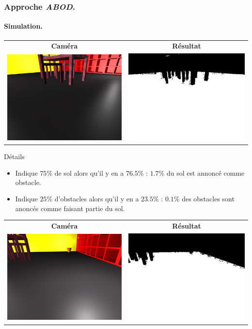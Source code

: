 \begin{frame}
    \frametitle{Approche \emph{ABOD}.}
    \framesubtitle{Simulation.}
    \begin{center}
         {
            \begin{tabular}{cc}
                \textbf{Caméra} & \textbf{Résultat} \\
                \includegraphics[width=0.4\linewidth]{rcs/abodv0s.png} & \includegraphics[width=0.4\linewidth]{rcs/abodv0r.png} \\
            \end{tabular}
            \begin{block}{Détails}
                \begin{itemize}
                    \item Indique $75\%$ de sol alors qu'il y en a $76.5\%$ : $1.7\%$  du sol est annoncé comme obstacle.
                    \item Indique $25\%$ d'obstacles alors qu'il y en a $23.5\%$ : $0.1\%$ des obstacles sont anoncés comme faisant partie du sol.
                \end{itemize}
            \end{block}
        }  {
            \begin{tabular}{cc}
                \textbf{Caméra} & \textbf{Résultat} \\
                \includegraphics[width=0.4\linewidth]{rcs/abodv1s.png} & \includegraphics[width=0.4\linewidth]{rcs/abodv1r.png} \\

\end{tabular}}
\end{center}
\end{frame}
